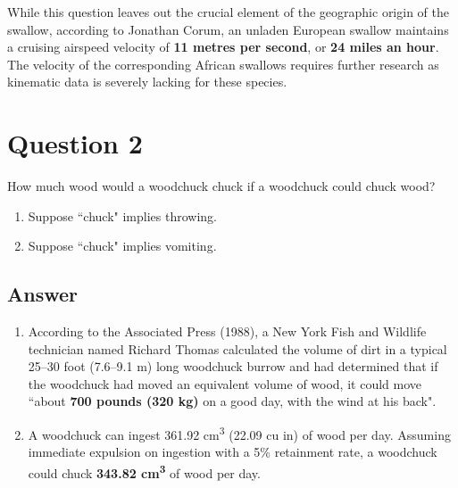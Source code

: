 \documentclass[
	12pt, %
	spanish, %
]{fphw}
\begin{document}
While this question leaves out the crucial element of the geographic origin of the swallow, according to Jonathan Corum, an unladen European swallow maintains a cruising airspeed velocity of \textbf{11 metres per second}, or \textbf{24 miles an hour}. The velocity of the corresponding African swallows requires further research as kinematic data is severely lacking for these species.


\section*{Question 2}

\begin{problem}
	How much wood would a woodchuck chuck if a woodchuck could chuck wood?
	
	\medskip
	
	\begin{enumerate} %
		\item Suppose ``chuck" implies throwing.
		\item Suppose ``chuck" implies vomiting.
	\end{enumerate}
\end{problem}


\subsection*{Answer}

\begin{enumerate} %
	\item According to the Associated Press (1988), a New York Fish and Wildlife technician named Richard Thomas calculated the volume of dirt in a typical 25--30 foot (7.6--9.1 m) long woodchuck burrow and had determined that if the woodchuck had moved an equivalent volume of wood, it could move ``about \textbf{700 pounds (320 kg)} on a good day, with the wind at his back".
    
	\item A woodchuck can ingest 361.92 cm\textsuperscript{3} (22.09 cu in) of wood per day. Assuming immediate expulsion on ingestion with a 5\% retainment rate, a woodchuck could chuck \textbf{343.82 cm\textsuperscript{3}} of wood per day.
\end{enumerate}
\end{document}
